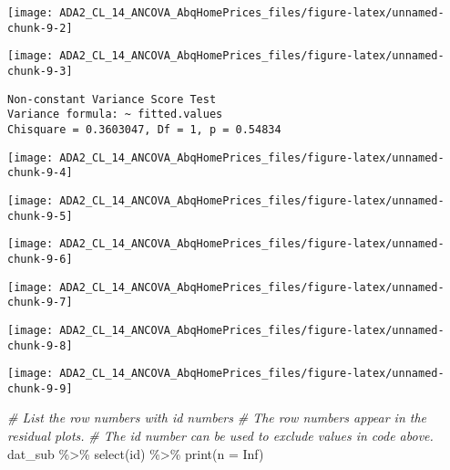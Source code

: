 \documentclass[
  12pt,
]{article}
\newenvironment{Shaded}{\begin{snugshade}}{\end{snugshade}}
\newcommand{\AttributeTok}[1]{\textcolor[rgb]{0.77,0.63,0.00}{#1}}
\newcommand{\CommentTok}[1]{\textcolor[rgb]{0.56,0.35,0.01}{\textit{#1}}}
\newcommand{\ConstantTok}[1]{\textcolor[rgb]{0.00,0.00,0.00}{#1}}
\newcommand{\FunctionTok}[1]{\textcolor[rgb]{0.00,0.00,0.00}{#1}}
\newcommand{\NormalTok}[1]{#1}
\newcommand{\SpecialCharTok}[1]{\textcolor[rgb]{0.00,0.00,0.00}{#1}}
\begin{document}
\begin{center}\texttt{[image: ADA2\_CL\_14\_ANCOVA\_AbqHomePrices\_files/figure-latex/unnamed-chunk-9-2]} \end{center}

\begin{center}\texttt{[image: ADA2\_CL\_14\_ANCOVA\_AbqHomePrices\_files/figure-latex/unnamed-chunk-9-3]} \end{center}

\begin{verbatim}
Non-constant Variance Score Test 
Variance formula: ~ fitted.values 
Chisquare = 0.3603047, Df = 1, p = 0.54834
\end{verbatim}

\begin{center}\texttt{[image: ADA2\_CL\_14\_ANCOVA\_AbqHomePrices\_files/figure-latex/unnamed-chunk-9-4]} \end{center}

\begin{center}\texttt{[image: ADA2\_CL\_14\_ANCOVA\_AbqHomePrices\_files/figure-latex/unnamed-chunk-9-5]} \end{center}

\begin{center}\texttt{[image: ADA2\_CL\_14\_ANCOVA\_AbqHomePrices\_files/figure-latex/unnamed-chunk-9-6]} \end{center}

\begin{center}\texttt{[image: ADA2\_CL\_14\_ANCOVA\_AbqHomePrices\_files/figure-latex/unnamed-chunk-9-7]} \end{center}

\begin{center}\texttt{[image: ADA2\_CL\_14\_ANCOVA\_AbqHomePrices\_files/figure-latex/unnamed-chunk-9-8]} \end{center}

\begin{center}\texttt{[image: ADA2\_CL\_14\_ANCOVA\_AbqHomePrices\_files/figure-latex/unnamed-chunk-9-9]} \end{center}

\begin{Shaded}
\begin{Highlighting}[]
\CommentTok{\# List the row numbers with id numbers}
\CommentTok{\#   The row numbers appear in the residual plots.}
\CommentTok{\#   The id number can be used to exclude values in code above.}
\NormalTok{dat\_sub }\SpecialCharTok{\%\textgreater{}\%} \FunctionTok{select}\NormalTok{(id) }\SpecialCharTok{\%\textgreater{}\%} \FunctionTok{print}\NormalTok{(}\AttributeTok{n =} \ConstantTok{Inf}\NormalTok{)}
\end{Highlighting}
\end{Shaded}
\end{document}
